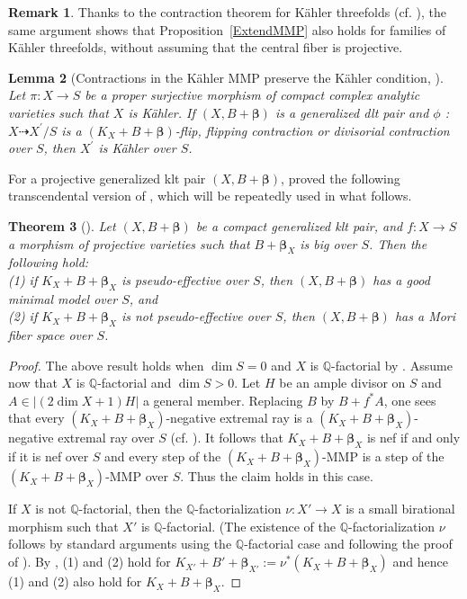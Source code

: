 \documentclass[12pt]{amsart}
\numberwithin{equation}{section}
\newtheorem{theorem} {Theorem} [section]
\newtheorem{lemma}  [theorem]     {Lemma}
\theoremstyle{definition}
\theoremstyle{plain}
\newtheorem*{thm A*}{Theorem A}
\newtheorem*{thm B*}{Theorem B}
\newtheorem*{thm C*}{Theorem C}
\newtheorem*{thm D*}{Theorem D}
\theoremstyle{definition}
\newtheorem{remark}  [theorem]     {Remark}
\renewcommand{\1}{\mathds{1}}
\newcommand{\bbeta}{\boldsymbol{\beta}}
\renewcommand{\>}{\rightarrow}
\newcommand{\Q}{\mathbb Q}
\begin{document}
\begin{remark}\label{Remark:ExtMMP}
Thanks to the contraction theorem for K\"ahler threefolds (cf. \cite[Theorem 1.2]{DH24}), the same argument shows that Proposition~\ref{ExtendMMP} also holds for families of K\"ahler threefolds, without assuming that the central fiber is projective.
\end{remark}

\begin{lemma}[{Contractions in the K\"ahler MMP preserve the K\"ahler condition, \cite[Lemma 2.24]{DHY23}}]\label{ContKahler}
Let $\pi: X \rightarrow S$ be a proper surjective morphism of compact complex analytic varieties such that $X$ is K\"ahler. If $(X, B+ { \boldsymbol{\beta}})$ is a generalized dlt pair and $\phi$ : $X \dashrightarrow X^{\prime}/S$ is a $(K_X+B+{ \boldsymbol{\beta}})$-flip, flipping contraction or divisorial contraction over $S$, then $X^{\prime}$ is K\"ahler over $S$. 
\end{lemma}


For a projective generalized klt pair $(X, B + \bbeta)$, \cite{DH24MMP} proved the following transcendental version of \cite{BirkarCHM}, which will be repeatedly used in what follows. 
\begin{theorem}[{\cite[Theorem 1.2]{DH24MMP}}]\label{Theorem: TransBCHM}
Let $(X, B+\boldsymbol{\beta})$ be a compact generalized klt pair, and $f:X\to S$ a morphism of projective varieties such that $B+\boldsymbol{\beta}_X$ is big over $S$. 
Then the following hold:\\
(1) if $K_X+B+\boldsymbol{\beta}_X$ is pseudo-effective over $S$, then $(X, B+\boldsymbol{\beta})$ has a good minimal model over $S$, and\\
(2) if $K_X+B+\boldsymbol{\beta}_X$ is not pseudo-effective over $S$, then $(X, B+\boldsymbol{\beta})$ has a Mori fiber space over $S$.
\end{theorem}
\begin{proof}
The above result holds when $\dim S=0$ and $X$ is $\Q$-factorial by \cite[Theorem 1.2]{DH24MMP}. Assume now that $X$ is $\Q$-factorial and $\dim S>0$. Let $H$ be an ample divisor on $S$ and $A\in |(2\dim X+1)H|$ a general member. Replacing $B$ by $B+f^*A$, one sees that every $(K_X+B+\bbeta _X)$-negative extremal ray is a $(K_X+B+\bbeta _X)$-negative extremal ray over $S$ (cf. \cite[Section 3]{HP24}). It follows that $K_X+B+\bbeta _X$ is nef if and only if it is nef over $S$ and every step of the $(K_X+B+\bbeta _X)$-MMP is a step of the $(K_X+B+\bbeta _X)$-MMP over $S$.
Thus the claim holds in this case.
    
 If $X$ is not $\Q$-factorial, then the $\Q$-factorialization $\nu:X'\to X$ is a small birational morphism such that $X'$ is $\Q$-factorial.  (The existence of the $\Q$-factorialization $\nu$ follows by standard arguments using the $\Q$-factorial case and following the proof of \cite[Theorem 1.5]{HP24}).  By {\cite[Theorem 1.2]{DH24MMP}}, (1) and (2) hold for $K_{X'}+B'+\bbeta _{X'}:=\nu ^*(K_X+B+\bbeta _X)$ and hence (1) and (2) also hold for $K_X+B+\bbeta _X$.
\end{proof}
\end{document}
